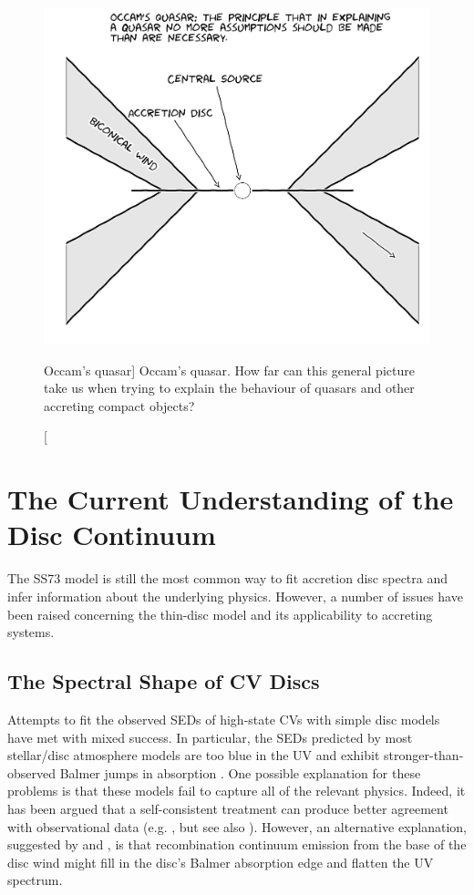 \begin{figure}
\centering
\includegraphics[width=1.0\textwidth]{figures/01-intro/occam.jpg}
\caption
[Occam's quasar]
{
Occam's quasar. How far can this general picture take us when trying to explain
the behaviour of quasars and other accreting compact objects?
} 
\label{fig:occam}
\end{figure}


\section{The Current Understanding of the Disc Continuum}

\label{sec:disc_continuum}

The SS73 model is still the most common way to fit accretion disc spectra and infer
information about the underlying physics. However, 
a number of issues have been raised concerning the thin-disc model and
its applicability to accreting systems. 

\subsection{The Spectral Shape of CV Discs}


Attempts to fit the observed SEDs of high-state CVs with simple disc models 
have met with mixed success. In
particular, the SEDs predicted by most stellar/disc atmosphere models 
are too blue in the UV \citep{wade1988,long1991,long1994,knigge1998} and exhibit
stronger-than-observed Balmer jumps in absorption 
\citep{wade1984,haug1987,ladous1989b,knigge1998}. One possible
explanation for these problems is that these models fail to capture
all of the relevant physics. Indeed, it has been argued that a
self-consistent treatment can produce better agreement with 
observational data (e.g. \citealt{shaviv1991}, but see also \citealt{idanshaviv2010}).
However, an alternative explanation, suggested by 
\cite{KLWB98} and \cite{hassall}, 
is that recombination continuum emission from the base of the 
disc wind might fill in the disc's Balmer absorption edge and flatten 
the UV spectrum.


